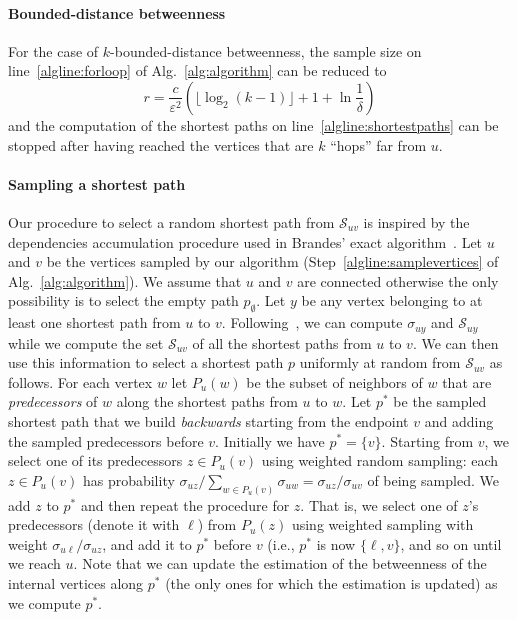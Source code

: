 \ifproof
\else
\paragraph{Bounded-distance betweenness} For the case of
$k$-bounded-distance betweenness, the sample size on line~\ref{algline:forloop}
of Alg.~\ref{alg:algorithm} can be reduced to 
\[ 
  r= \frac{c}{\varepsilon^2}\left(\lfloor\log_2(k-1)\rfloor + 1 +\ln\frac{1}{\delta}\right)
\]
and the computation of the shortest paths on line~\ref{algline:shortestpaths}
can be stopped after having reached the vertices that are $k$ ``hops'' far from $u$.
\fi

\paragraph{Sampling a shortest path}
Our procedure to select a random shortest path from $\mathcal{S}_{uv}$ is
inspired by the dependencies accumulation procedure used in Brandes' exact
algorithm~\citep{Brandes01}. 
Let $u$ and $v$ be the vertices sampled by our algorithm
(Step~\ref{algline:samplevertices} of Alg.~\ref{alg:algorithm}). We assume that $u$ and
$v$ are connected otherwise the only possibility is to select the empty path
$p_\emptyset$. Let $y$ be any vertex belonging to at least one shortest path
from $u$ to $v$. Following~\citet{Brandes01}, we can compute $\sigma_{uy}$ and
$\mathcal{S}_{uy}$ while we compute the set $\mathcal{S}_{uv}$ of all the
shortest paths from $u$ to $v$. We can then use this information to select a
shortest path $p$ uniformly at random from $\mathcal{S}_{uv}$ as follows. For
each vertex $w$ let $P_u(w)$ be the subset of neighbors of $w$ that are
\emph{predecessors} of $w$ along the shortest paths from $u$ to $w$. Let $p^*$
be the sampled shortest path that we build \emph{backwards} starting from the endpoint
$v$ and adding the sampled predecessors before ${v}$. Initially we have $p^*=\{v\}$. Starting
from $v$, we select one of its predecessors $z\in P_u(v)$ using weighted random
sampling: each $z\in P_u(v)$ has probability $\sigma_{uz}/\sum_{w\in
P_u(v)}\sigma_{uw}=\sigma_{uz}/\sigma_{uv}$ of being sampled. We add $z$ to
$p^*$ and then repeat the procedure for $z$. That is, we select one of $z$'s
predecessors (denote it with $\ell$) from $P_u(z)$ using weighted sampling with
weight $\sigma_{u\ell}/\sigma_{uz}$, and add it to $p^*$ before $v$ (i.e., $p^*$
is now $\{\ell, v\}$, and so on until we reach $u$. Note that we
can update the estimation of the betweenness of the internal vertices along
$p^*$ (the only ones for which the estimation is updated) as we compute $p^*$.

